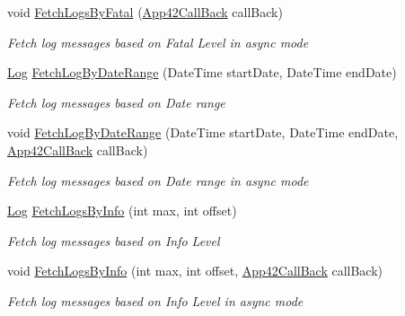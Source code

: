 \begin{DoxyCompactItemize}
void \hyperlink{classcom_1_1shephertz_1_1app42_1_1paas_1_1sdk_1_1csharp_1_1log_1_1_log_service_af8e08c00d3da95f2c7fd76c3e92bc7c6}{Fetch\+Logs\+By\+Fatal} (\hyperlink{interfacecom_1_1shephertz_1_1app42_1_1paas_1_1sdk_1_1csharp_1_1_app42_call_back}{App42\+Call\+Back} call\+Back)
\begin{DoxyCompactList}\small\item\em Fetch log messages based on Fatal Level in async mode \end{DoxyCompactList}\item 
\hyperlink{classcom_1_1shephertz_1_1app42_1_1paas_1_1sdk_1_1csharp_1_1log_1_1_log}{Log} \hyperlink{classcom_1_1shephertz_1_1app42_1_1paas_1_1sdk_1_1csharp_1_1log_1_1_log_service_a23b9712672b35d88c8e4d399153bf91c}{Fetch\+Log\+By\+Date\+Range} (Date\+Time start\+Date, Date\+Time end\+Date)
\begin{DoxyCompactList}\small\item\em Fetch log messages based on Date range \end{DoxyCompactList}\item 
void \hyperlink{classcom_1_1shephertz_1_1app42_1_1paas_1_1sdk_1_1csharp_1_1log_1_1_log_service_a2cfdc963fc5e155c5e4270238e6a02b3}{Fetch\+Log\+By\+Date\+Range} (Date\+Time start\+Date, Date\+Time end\+Date, \hyperlink{interfacecom_1_1shephertz_1_1app42_1_1paas_1_1sdk_1_1csharp_1_1_app42_call_back}{App42\+Call\+Back} call\+Back)
\begin{DoxyCompactList}\small\item\em Fetch log messages based on Date range in async mode \end{DoxyCompactList}\item 
\hyperlink{classcom_1_1shephertz_1_1app42_1_1paas_1_1sdk_1_1csharp_1_1log_1_1_log}{Log} \hyperlink{classcom_1_1shephertz_1_1app42_1_1paas_1_1sdk_1_1csharp_1_1log_1_1_log_service_a8f55b3d988bd15f355fb15c0726d2d42}{Fetch\+Logs\+By\+Info} (int max, int offset)
\begin{DoxyCompactList}\small\item\em Fetch log messages based on Info Level \end{DoxyCompactList}\item 
void \hyperlink{classcom_1_1shephertz_1_1app42_1_1paas_1_1sdk_1_1csharp_1_1log_1_1_log_service_ae2d1fccbcb3d3e8cfbede288fa15bff3}{Fetch\+Logs\+By\+Info} (int max, int offset, \hyperlink{interfacecom_1_1shephertz_1_1app42_1_1paas_1_1sdk_1_1csharp_1_1_app42_call_back}{App42\+Call\+Back} call\+Back)
\begin{DoxyCompactList}\small\item\em Fetch log messages based on Info Level in async mode \end{DoxyCompactList}\item 

\end{DoxyCompactItemize}

